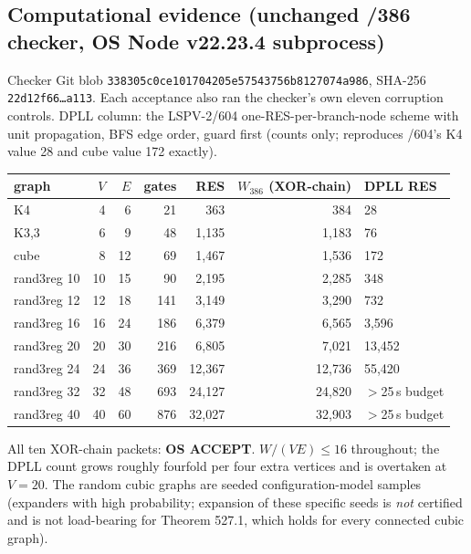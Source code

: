 \documentclass[11pt]{article}
\begin{document}
\subsection*{Computational evidence (unchanged /386 checker, OS Node v22.23.4 subprocess)}
Checker Git blob \texttt{338305c0ce101704205e57543756b8127074a986}, SHA-256
\texttt{22d12f66\ldots a113}. Each acceptance also ran the checker's own eleven corruption
controls. DPLL column: the LSPV-2/604 one-RES-per-branch-node scheme with unit propagation,
BFS edge order, guard first (counts only; reproduces /604's K4 value 28 and cube value 172 exactly).
\begin{center}
\begin{tabular}{lrrrrrl}\toprule
graph & $V$ & $E$ & gates & RES & $W_{386}$ (XOR-chain) & DPLL RES\\\midrule
K4 & 4 & 6 & 21 & 363 & 384 & 28\\
K3,3 & 6 & 9 & 48 & 1{,}135 & 1{,}183 & 76\\
cube & 8 & 12 & 69 & 1{,}467 & 1{,}536 & 172\\
rand3reg 10 & 10 & 15 & 90 & 2{,}195 & 2{,}285 & 348\\
rand3reg 12 & 12 & 18 & 141 & 3{,}149 & 3{,}290 & 732\\
rand3reg 16 & 16 & 24 & 186 & 6{,}379 & 6{,}565 & 3{,}596\\
rand3reg 20 & 20 & 30 & 216 & 6{,}805 & 7{,}021 & 13{,}452\\
rand3reg 24 & 24 & 36 & 369 & 12{,}367 & 12{,}736 & 55{,}420\\
rand3reg 32 & 32 & 48 & 693 & 24{,}127 & 24{,}820 & $>$25\,s budget\\
rand3reg 40 & 40 & 60 & 876 & 32{,}027 & 32{,}903 & $>$25\,s budget\\\bottomrule
\end{tabular}
\end{center}
All ten XOR-chain packets: \textbf{OS ACCEPT}. $W/(VE)\le 16$ throughout; the DPLL count grows
roughly fourfold per four extra vertices and is overtaken at $V=20$. The random cubic graphs are
seeded configuration-model samples (expanders with high probability; expansion of these specific
seeds is \emph{not} certified and is not load-bearing for Theorem 527.1, which holds for every
connected cubic graph).
\end{document}
